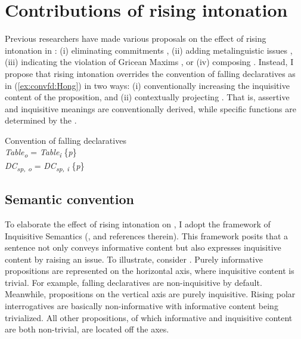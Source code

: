 \documentclass[output=paper,colorlinks,citecolor=brown]{langscibook}
\begin{document}
\section{Contributions of rising intonation}
\label{sec:contris:Hong}

Previous researchers have made various proposals on the effect of rising intonation in : (i) eliminating commitments \citep[e.g.,][]{gunlogson2008question, rudin2018risinga, rudin2022intonational}, (ii) adding metalinguistic issues \citep[e.g.,][]{malamud2015three}, (iii) indicating the violation of Gricean Maxims \citep[e.g.,][]{westera2017exhaustivity, westera2018rising}, or (iv) composing  \citep[e.g.,][]{farkas2017division}. Instead, I propose that rising intonation overrides the convention of falling declaratives as in (\ref{ex:convfd:Hong}) in two ways: (i) conventionally increasing the inquisitive content of the proposition, and (ii) contextually projecting . That is, assertive and inquisitive meanings are conventionally derived, while specific functions are determined by the .

\ea \label{ex:convfd:Hong} Convention of falling declaratives\\
    \ea \textit{Table\textsubscript{o}} = \textit{Table\textsubscript{i}} \cup {} \{\textit{p}\}\\
    \ex \textit{DC\textsubscript{sp, o}} = \textit{DC\textsubscript{sp, i}} \cup {} \{\textit{p}\}
    \z
\z

\subsection{Semantic convention}
\label{sec:semconv:Hong}

To elaborate the effect of rising intonation on , I adopt the framework of Inquisitive Semantics (\citealt{ciardelli2013inquisitive, ciardelli2018inquisitive}, and references therein). This framework posits that a sentence not only conveys informative content but also expresses inquisitive content by raising an issue. To illustrate, consider . Purely informative propositions are represented on the horizontal axis, where inquisitive content is trivial. For example, falling declaratives are non-inquisitive by default. Meanwhile, propositions on the vertical axis are purely inquisitive. Rising polar interrogatives are basically non-informative with informative content being trivialized. All other propositions, of which informative and inquisitive content are both non-trivial, are located off the axes.
\end{document}

